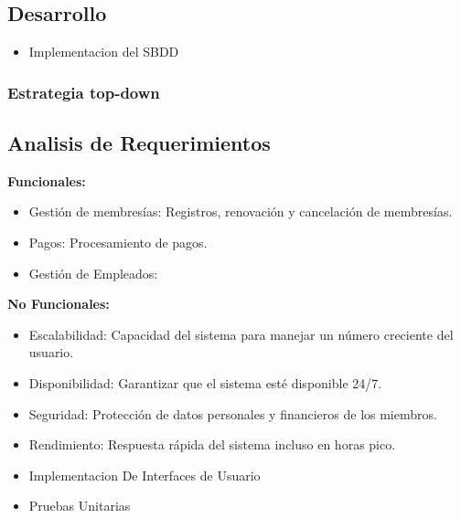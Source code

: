 \documentclass[spanish, 12pt]{article}
\providecommand{\tightlist}{\setlength{\itemsep}{0pt}
\setlength{\parskip}{0pt}}
\renewenvironment{quote}{\begin{customblockquote}\list{}{\rightmargin=0em\leftmargin=0em}%
\item\relax
\color{blockquote-text}
\ignorespaces}{\unskip\unskip\endlist\end{customblockquote}}
\begin{document}
	\subsection{Desarrollo}
	\label{desarrollo}

	\begin{itemize}
		\tightlist

		\item Implementacion del SBDD
	\end{itemize}

	\subsubsection{Estrategia top-down}
	\label{estrategia-top-down}

	\subsection{Analisis de Requerimientos}
	\label{analisis-de-requerimientos}

	\textbf{Funcionales:}

	\begin{itemize}
		\tightlist

		\item Gestión de membresías: Registros, renovación y cancelación de membresías.

		\item Pagos: Procesamiento de pagos.

		\item Gestión de Empleados:
	\end{itemize}

	\textbf{No Funcionales:}

	\begin{itemize}
		\tightlist

		\item Escalabilidad: Capacidad del sistema para manejar un número creciente
			del usuario.

		\item Disponibilidad: Garantizar que el sistema esté disponible 24/7.

		\item Seguridad: Protección de datos personales y financieros de los
			miembros.

		\item Rendimiento: Respuesta rápida del sistema incluso en horas pico.
	\end{itemize}

	\begin{quote}
		\begin{itemize}
			\tightlist

			\item Implementacion De Interfaces de Usuario

			\item Pruebas Unitarias
		\end{itemize}
	\end{quote}
\end{document}
